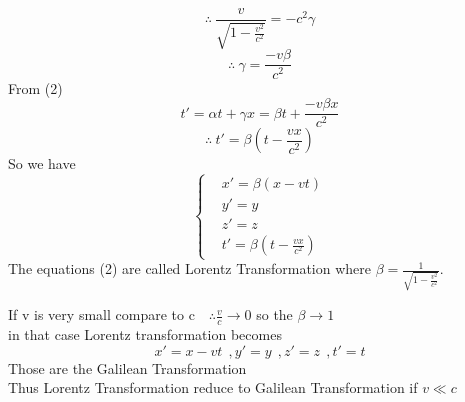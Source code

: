 \[
\therefore \ \frac{v}{\sqrt{1-\frac{v^2}{c^2}}} = -c^2 \gamma
\]
\[
\therefore \ \gamma = \frac{-v \beta}{c^2}
\]
From (2)
\[
t' = \alpha t + \gamma x = \beta t + \frac{-v \beta x}{c^2}
\]
\[
\therefore \ t' = \beta\left(t - \frac{vx}{c^2}\right)
\]
\setcounter{equation}{1}
So we have
\begin{equation}
    \begin{cases}
    &x' = \beta(x-vt)\\
    &y' =y\\
    &z' =z\\
    &t' =\beta\left(t - \displaystyle \frac{vx}{c^2}\right)
    \end{cases}    
\end{equation}
The equations (2) are called Lorentz Transformation where $\displaystyle \beta = \frac{1}{\sqrt{1-\frac{v^2}{c^2}}}$.
\begin{observation}
    If v is very small compare to c $ \ \ \ \therefore \displaystyle \frac{v}{c} \to 0$ so the $\beta \to 1$\\
    in that case Lorentz transformation becomes 
    \[
        x' = x-vt  \ \ ,
        y' =y   \ \ ,
        z' =z   \ \ ,
        t' =t
    \]
    Those are the Galilean Transformation\\
    Thus Lorentz Transformation reduce to Galilean Transformation if $v \ll c$
\end{observation}



